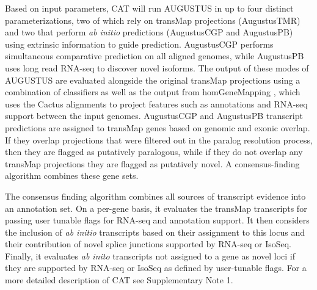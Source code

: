 \documentclass[fleqn,10pt]{wlscirep}
\begin{document}
Based on input parameters, CAT will run AUGUSTUS in up to four distinct parameterizations, two of which rely on transMap projections (AugustusTMR) and two that perform \textit{ab initio} predictions (AugustusCGP and AugustusPB) using extrinsic information to guide prediction. AugustusCGP performs simultaneous comparative prediction \cite{konig2015simultaneous} on all aligned genomes, while AugustusPB uses long read RNA-seq to discover novel isoforms. The output of these modes of AUGUSTUS are evaluated alongside the original transMap projections using a combination of classifiers as well as the output from homGeneMapping \cite{stanke2004augustus}, which uses the Cactus alignments to project features such as annotations and RNA-seq support between the input genomes. AugustusCGP and AugustusPB transcript predictions are assigned to transMap genes based on genomic and exonic overlap. If they overlap projections that were filtered out in the paralog resolution process, then they are flagged as putatively paralogous, while if they do not overlap any transMap projections they are flagged as putatively novel. A consensus-finding algorithm combines these gene sets.

The consensus finding algorithm combines all sources of transcript evidence into an annotation set. On a per-gene basis, it evaluates the transMap transcripts for passing user tunable flags for RNA-seq and annotation support. It then considers the inclusion of \textit{ab initio} transcripts based on their assignment to this locus and their contribution of novel splice junctions supported by RNA-seq or IsoSeq. Finally, it evaluates \textit{ab inito} transcripts not assigned to a gene as novel loci if they are supported by RNA-seq or IsoSeq as defined by user-tunable flags. For a more detailed description of CAT see Supplementary Note 1.
\end{document}
